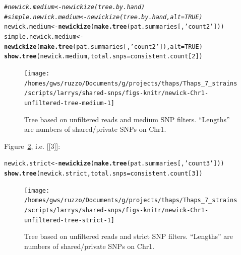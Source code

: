 \documentclass{article}\usepackage[]{graphicx}\usepackage[]{color}
\makeatletter
\newcommand{\hlnum}[1]{\textcolor[rgb]{0.686,0.059,0.569}{#1}}%
\newcommand{\hlstr}[1]{\textcolor[rgb]{0.192,0.494,0.8}{#1}}%
\newcommand{\hlcom}[1]{\textcolor[rgb]{0.678,0.584,0.686}{\textit{#1}}}%
\newcommand{\hlstd}[1]{\textcolor[rgb]{0.345,0.345,0.345}{#1}}%
\newcommand{\hlkwb}[1]{\textcolor[rgb]{0.69,0.353,0.396}{#1}}%
\newcommand{\hlkwc}[1]{\textcolor[rgb]{0.333,0.667,0.333}{#1}}%
\newcommand{\hlkwd}[1]{\textcolor[rgb]{0.737,0.353,0.396}{\textbf{#1}}}%
\newenvironment{kframe}{%
 \def\at@end@of@kframe{}%
 \ifinner\ifhmode%
  \def\at@end@of@kframe{\end{minipage}}%
  \begin{minipage}{\columnwidth}%
 \fi\fi%
 \def\FrameCommand##1{\hskip\@totalleftmargin \hskip-\fboxsep
 \colorbox{shadecolor}{##1}\hskip-\fboxsep
     \hskip-\linewidth \hskip-\@totalleftmargin \hskip\columnwidth}%
 \MakeFramed {\advance\hsize-\width
   \@totalleftmargin\z@ \linewidth\hsize
   \@setminipage}}%
 {\par\unskip\endMakeFramed%
 \at@end@of@kframe}
\newenvironment{knitrout}{}{} %
\makeatother
\begin{document}
\begin{knitrout}\scriptsize
{}\color{fgcolor}\begin{kframe}
\begin{alltt}
\hlcom{# newick.medium <- newickize(tree.by.hand)}
\hlcom{# simple.newick.medium <- newickize(tree.by.hand,alt=TRUE)}
\hlstd{newick.medium} \hlkwb{<-} \hlkwd{newickize}\hlstd{(}\hlkwd{make.tree}\hlstd{(pat.summaries[,}\hlstr{'count2'}\hlstd{]))}
\hlstd{simple.newick.medium} \hlkwb{<-} \hlkwd{newickize}\hlstd{(}\hlkwd{make.tree}\hlstd{(pat.summaries[,}\hlstr{'count2'}\hlstd{]),}\hlkwc{alt}\hlstd{=}\hlnum{TRUE}\hlstd{)}
\hlkwd{show.tree}\hlstd{(newick.medium,} \hlkwc{total.snps}\hlstd{=consistent.count[}\hlnum{2}\hlstd{])}
\end{alltt}
\end{kframe}\begin{figure}

{\centering \texttt{[image: /homes/gws/ruzzo/Documents/g/projects/thaps/Thaps\_7\_strains/scripts/larrys/shared-snps/figs-knitr/newick-Chr1-unfiltered-tree-medium-1]} 

}

\caption[Tree based on unfiltered reads and medium SNP filters]{Tree based on unfiltered reads and medium SNP filters.  ``Lengths'' are numbers of shared/private SNPs on Chr1.}\label{fig:tree-medium}
\end{figure}


\end{knitrout}

Figure~\ref{fig:tree-strict}, i.e. [[3]]:

\begin{knitrout}\scriptsize
{}\color{fgcolor}\begin{kframe}
\begin{alltt}
\hlstd{newick.strict} \hlkwb{<-} \hlkwd{newickize}\hlstd{(}\hlkwd{make.tree}\hlstd{(pat.summaries[,}\hlstr{'count3'}\hlstd{]))}
\hlkwd{show.tree}\hlstd{(newick.strict,} \hlkwc{total.snps}\hlstd{=consistent.count[}\hlnum{3}\hlstd{])}
\end{alltt}
\end{kframe}\begin{figure}

{\centering \texttt{[image: /homes/gws/ruzzo/Documents/g/projects/thaps/Thaps\_7\_strains/scripts/larrys/shared-snps/figs-knitr/newick-Chr1-unfiltered-tree-strict-1]} 

}

\caption[Tree based on unfiltered reads and strict SNP filters]{Tree based on unfiltered reads and strict SNP filters.  ``Lengths'' are numbers of shared/private SNPs on Chr1.}\label{fig:tree-strict}
\end{figure}


\end{knitrout}
\end{document}
